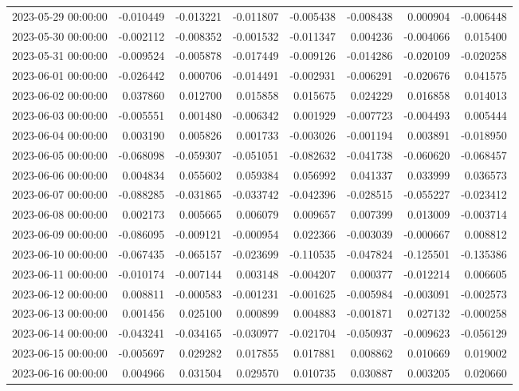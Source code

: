 \begin{tabular}{lrrrrrrr}
2023-05-29 00:00:00 & -0.010449 & -0.013221 & -0.011807 & -0.005438 & -0.008438 & 0.000904 & -0.006448 \\
2023-05-30 00:00:00 & -0.002112 & -0.008352 & -0.001532 & -0.011347 & 0.004236 & -0.004066 & 0.015400 \\
2023-05-31 00:00:00 & -0.009524 & -0.005878 & -0.017449 & -0.009126 & -0.014286 & -0.020109 & -0.020258 \\
2023-06-01 00:00:00 & -0.026442 & 0.000706 & -0.014491 & -0.002931 & -0.006291 & -0.020676 & 0.041575 \\
2023-06-02 00:00:00 & 0.037860 & 0.012700 & 0.015858 & 0.015675 & 0.024229 & 0.016858 & 0.014013 \\
2023-06-03 00:00:00 & -0.005551 & 0.001480 & -0.006342 & 0.001929 & -0.007723 & -0.004493 & 0.005444 \\
2023-06-04 00:00:00 & 0.003190 & 0.005826 & 0.001733 & -0.003026 & -0.001194 & 0.003891 & -0.018950 \\
2023-06-05 00:00:00 & -0.068098 & -0.059307 & -0.051051 & -0.082632 & -0.041738 & -0.060620 & -0.068457 \\
2023-06-06 00:00:00 & 0.004834 & 0.055602 & 0.059384 & 0.056992 & 0.041337 & 0.033999 & 0.036573 \\
2023-06-07 00:00:00 & -0.088285 & -0.031865 & -0.033742 & -0.042396 & -0.028515 & -0.055227 & -0.023412 \\
2023-06-08 00:00:00 & 0.002173 & 0.005665 & 0.006079 & 0.009657 & 0.007399 & 0.013009 & -0.003714 \\
2023-06-09 00:00:00 & -0.086095 & -0.009121 & -0.000954 & 0.022366 & -0.003039 & -0.000667 & 0.008812 \\
2023-06-10 00:00:00 & -0.067435 & -0.065157 & -0.023699 & -0.110535 & -0.047824 & -0.125501 & -0.135386 \\
2023-06-11 00:00:00 & -0.010174 & -0.007144 & 0.003148 & -0.004207 & 0.000377 & -0.012214 & 0.006605 \\
2023-06-12 00:00:00 & 0.008811 & -0.000583 & -0.001231 & -0.001625 & -0.005984 & -0.003091 & -0.002573 \\
2023-06-13 00:00:00 & 0.001456 & 0.025100 & 0.000899 & 0.004883 & -0.001871 & 0.027132 & -0.000258 \\
2023-06-14 00:00:00 & -0.043241 & -0.034165 & -0.030977 & -0.021704 & -0.050937 & -0.009623 & -0.056129 \\
2023-06-15 00:00:00 & -0.005697 & 0.029282 & 0.017855 & 0.017881 & 0.008862 & 0.010669 & 0.019002 \\
2023-06-16 00:00:00 & 0.004966 & 0.031504 & 0.029570 & 0.010735 & 0.030887 & 0.003205 & 0.020660 \\

\end{tabular}
